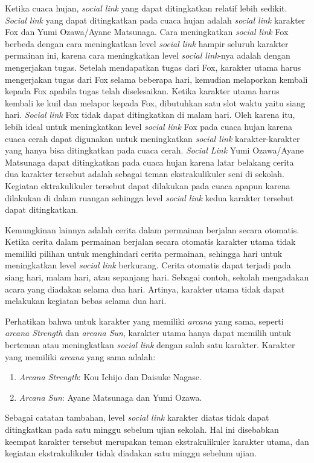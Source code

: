 Ketika cuaca hujan, \textit{social link} yang dapat ditingkatkan relatif lebih sedikit. \textit{Social link} yang dapat ditingkatkan pada cuaca hujan adalah \textit{social link} karakter Fox dan Yumi Ozawa/Ayane Matsunaga. Cara meningkatkan \textit{social link} Fox berbeda dengan cara meningkatkan level \textit{social link} hampir seluruh karakter permainan ini, karena cara meningkatkan level \textit{social link}-nya adalah dengan mengerjakan tugas. Setelah mendapatkan tugas dari Fox, karakter utama harus mengerjakan tugas dari Fox selama beberapa hari, kemudian melaporkan kembali kepada Fox apabila tugas telah diselesaikan. Ketika karakter utama harus kembali ke kuil dan melapor kepada Fox, dibutuhkan satu slot waktu yaitu siang hari. \textit{Social link} Fox tidak dapat ditingkatkan di malam hari. Oleh karena itu, lebih ideal untuk meningkatkan level \textit{social link} Fox pada cuaca hujan karena cuaca cerah dapat digunakan untuk meningkatkan \textit{social link} karakter-karakter yang hanya bisa ditingkatkan pada cuaca cerah. \textit{Social Link} Yumi Ozawa/Ayane Matsunaga dapat ditingkatkan pada cuaca hujan karena latar belakang cerita dua karakter tersebut adalah sebagai teman ekstrakulikuler seni di sekolah. Kegiatan ektrakulikuler tersebut dapat dilakukan pada cuaca apapun karena dilakukan di dalam ruangan sehingga level \textit{social link} kedua karakter tersebut dapat ditingkatkan.

Kemungkinan lainnya adalah cerita dalam permainan berjalan secara otomatis. Ketika cerita dalam permainan berjalan secara otomatis karakter utama tidak memiliki pilihan untuk menghindari cerita permainan, sehingga hari untuk meningkatkan level \textit{social link} berkurang. Cerita otomatis dapat terjadi pada siang hari, malam hari, atau sepanjang hari. Sebagai contoh, sekolah mengadakan acara yang diadakan selama dua hari. Artinya, karakter utama tidak dapat melakukan kegiatan bebas selama dua hari.

Perhatikan bahwa untuk karakter yang memiliki \textit{arcana} yang sama, seperti \textit{arcana Strength} dan \textit{arcana Sun}, karakter utama hanya dapat memilih untuk berteman atau meningkatkan \textit{social link} dengan salah satu karakter. Karakter yang memiliki \textit{arcana} yang sama adalah:
\begin{enumerate}
    \item \textit{Arcana Strength}: Kou Ichijo dan Daisuke Nagase.
    \item \textit{Arcana Sun}: Ayane Matsunaga dan Yumi Ozawa.
\end{enumerate}
Sebagai catatan tambahan, level \textit{social link} karakter diatas tidak dapat ditingkatkan pada satu minggu sebelum ujian sekolah. Hal ini disebabkan keempat karakter tersebut merupakan teman ekstrakulikuler karakter utama, dan kegiatan ekstrakulikuler tidak diadakan satu minggu sebelum ujian.

